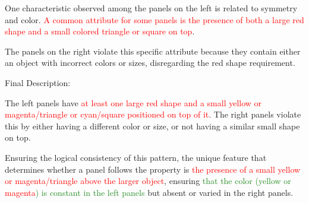 \begin{tcolorbox}[breakable,enhanced jigsaw,opacityback=0,]
\begin{dialogue}
		One characteristic observed among the panels on the left is related to symmetry and color. \textcolor{red}{A common attribute for some panels is the presence of both a large red shape and a small colored triangle or square on top}.
		
		The panels on the right violate this specific attribute because they contain either an object with incorrect colors or sizes, disregarding the red shape requirement.
		
		Final Description:
		
		The left panels have \textcolor{red}{at least one large red shape and a small yellow or magenta/triangle or cyan/square positioned on top of it}. The right panels violate this by either having a different color or size, or not having a similar small shape on top.
		
		Ensuring the logical consistency of this pattern, the unique feature that determines whether a panel follows the property is \textcolor{red}{the presence of a small yellow or magenta/triangle above the larger object}, ensuring \textcolor{ForestGreen}{that the color (yellow or }\textcolor{red}{magenta}\textcolor{ForestGreen}{) is constant in the left panels} but absent or varied in the right panels.
	\end{dialogue}
	\label{fig:task8-bongard}
\end{tcolorbox}




